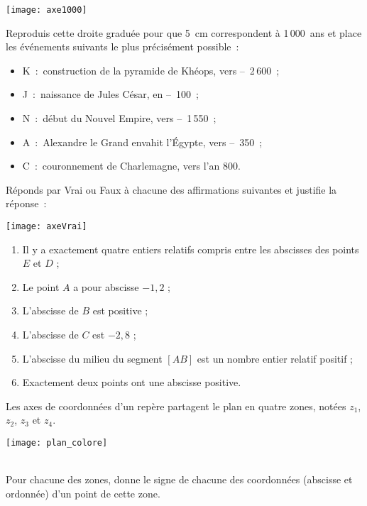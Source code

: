 \begin{exercice}[Histoires]
\begin{center} \texttt{[image: axe1000]} \end{center}
Reproduis cette droite graduée pour que 5 cm correspondent à 1\,000 ans et place les événements suivants le plus précisément possible :
\begin{itemize}
 \item K : construction de la pyramide de Khéops, vers – 2\,600 ;
 \item J : naissance de Jules César, en – 100 ;
 \item N : début du Nouvel Empire, vers – 1\,550 ;
 \item A : Alexandre le Grand envahit l'Égypte, vers – 350 ;
 \item C : couronnement de Charlemagne, vers l'an 800.
 \end{itemize}
\end{exercice}


\begin{exercice}
Réponds par Vrai ou Faux à chacune des affirmations suivantes et justifie la réponse :
\begin{center} \texttt{[image: axeVrai]} \end{center}
\begin{enumerate}
 \item Il y a exactement quatre entiers relatifs compris entre les abscisses des points $E$ et $D$ ;
 \item Le point $A$ a pour abscisse $- 1,2$ ;
 \item L'abscisse de $B$ est positive ;
 \item L'abscisse de $C$ est $- 2,8$ ;
 \item L'abscisse du milieu du segment $[AB]$ est un nombre entier relatif positif ;
 \item Exactement deux points ont une abscisse positive.
 \end{enumerate}
\end{exercice}



\begin{exercice}
\begin{minipage}[c]{0.3\linewidth}
Les axes de coordonnées d'un repère partagent le plan en quatre zones, notées $z_1$, $z_2$, $z_3$ et $z_4$.
 \end{minipage} \hfill%
 \begin{minipage}[c]{0.65\linewidth}
 \texttt{[image: plan\_colore]}
  \end{minipage} \\[1em]
Pour chacune des zones, donne le signe de chacune des coordonnées (abscisse et ordonnée) d'un point de cette zone.
\end{exercice}


